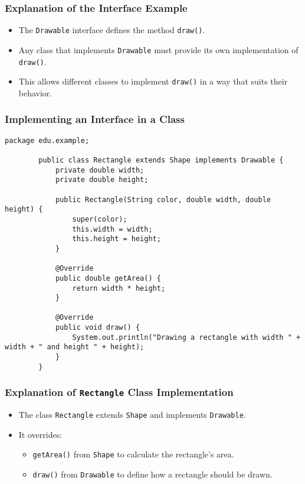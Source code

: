 \documentclass[aspectratio=169, table]{beamer}
\begin{document}
\begin{frame}[fragile]
	\frametitle{Explanation of the Interface Example}
	
	\begin{itemize}
		\item The \texttt{Drawable} interface defines the method \texttt{draw()}.
		\item Any class that implements \texttt{Drawable} must provide its own implementation of \texttt{draw()}.
		\item This allows different classes to implement \texttt{draw()} in a way that suits their behavior.
	\end{itemize}
\end{frame}

\begin{frame}[fragile]
	\frametitle{Implementing an Interface in a Class}
	
	\begin{lstlisting}[style=JavaStyle, caption={Implementing an Interface: \texttt{Rectangle.java}}]
		package edu.example;
		
		public class Rectangle extends Shape implements Drawable {
			private double width;
			private double height;
			
			public Rectangle(String color, double width, double height) {
				super(color);
				this.width = width;
				this.height = height;
			}
			
			@Override
			public double getArea() {
				return width * height;
			}
			
			@Override
			public void draw() {
				System.out.println("Drawing a rectangle with width " + width + " and height " + height);
			}
		}
	\end{lstlisting}
\end{frame}

\begin{frame}[fragile]
	\frametitle{\LARGE{Explanation of \texttt{Rectangle} Class Implementation}}
	
	\begin{itemize}
		\item The class \texttt{Rectangle} extends \texttt{Shape} and implements \texttt{Drawable}.
		\item It overrides:
		\begin{itemize}
			\item \texttt{getArea()} from \texttt{Shape} to calculate the rectangle's area.
			\item \texttt{draw()} from \texttt{Drawable} to define how a rectangle should be drawn.
		\end{itemize}
	\end{itemize}
\end{frame}
\end{document}
